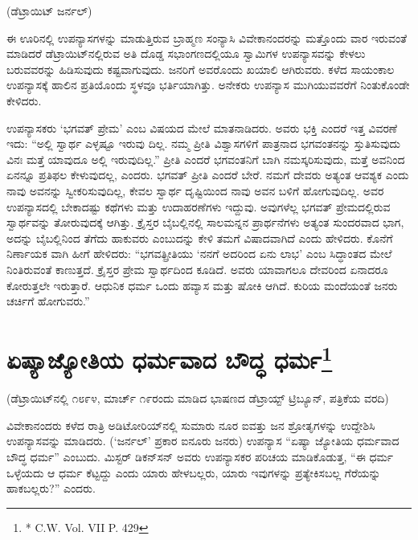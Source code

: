 \delimiter

\begin{center}
(ಡೆಟ್ರಾಯಿಟ್​ ಜರ್ನಲ್​)
\end{center}

ಈ ಊರಿನಲ್ಲಿ ಉಪನ್ಯಾಸಗಳನ್ನು ಮಾಡುತ್ತಿರುವ ಬ್ರಾಹ್ಮಣ ಸಂನ್ಯಾಸಿ ವಿವೇಕಾನಂದರನ್ನು ಮತ್ತೊಂದು ವಾರ ಇರುವಂತೆ ಮಾಡಿದರೆ ಡೆಟ್ರಾಯಿಟ್​ನಲ್ಲಿರುವ ಅತಿ ದೊಡ್ಡ ಸಭಾಂಗಣದಲ್ಲಿಯೂ ಸ್ವಾಮಿಗಳ ಉಪನ್ಯಾಸವನ್ನು ಕೇಳಲು ಬರುವವರನ್ನು ಹಿಡಿಸುವುದು ಕಷ್ಟವಾಗುವುದು. ಜನರಿಗೆ ಅವರೊಂದು ಖಯಾಲಿ ಆಗಿರುವರು. ಕಳೆದ ಸಾಯಂಕಾಲ ಉಪನ್ಯಾಸಕ್ಕೆ ಹಾಲಿನ ಪ್ರತಿಯೊಂದು ಸ್ಥಳವೂ ಭರ್ತಿಯಾಗಿತ್ತು. ಅನೇಕರು ಉಪನ್ಯಾಸ ಮುಗಿಯುವವರೆಗೆ ನಿಂತುಕೊಂಡೇ ಕೇಳಿದರು.

ಉಪನ್ಯಾಸಕರು ‘ಭಗವತ್​ ಪ್ರೇಮ’ ಎಂಬ ವಿಷಯದ ಮೇಲೆ ಮಾತನಾಡಿದರು. ಅವರು ಭಕ್ತಿ ಎಂದರೆ ಇತ್ತ ವಿವರಣೆ ಇದು: “ಅಲ್ಲಿ ಸ್ವಾರ್ಥ ಎಳ್ಳಷ್ಟೂ ಇರುವು ದಿಲ್ಲ. ನಮ್ಮ ಪ್ರೀತಿ ವಿಶ್ವಾಸಗಳಿಗೆ ಪಾತ್ರನಾದ ಭಗವಂತನನ್ನು ಸ್ತುತಿಸುವುದು ವಿನಃ ಮತ್ತೆ ಯಾವುದೂ ಅಲ್ಲಿ ಇರುವುದಿಲ್ಲ.” ಪ್ರೀತಿ ಎಂದರೆ ಭಗವಂತನಿಗೆ ಬಾಗಿ ನಮಸ್ಕರಿಸುವುದು, ಮತ್ತೆ ಅವನಿಂದ ಏನನ್ನೂ ಪ್ರತಿಫಲ ಕೇಳುವುದಲ್ಲ, ಎಂದರು. ಭಗವತ್​ ಪ್ರೀತಿ ಎಂದರೆ ಬೇರೆ. ನಮಗೆ ದೇವರು ಅತ್ಯಂತ ಆವಶ್ಯಕ ಎಂದು ನಾವು ಅವನನ್ನು ಸ್ವೀಕರಿಸುವುದಿಲ್ಲ, ಕೇವಲ ಸ್ವಾರ್ಥ ದೃಷ್ಟಿಯಿಂದ ನಾವು ಅವನ ಬಳಿಗೆ ಹೋಗುವುದಿಲ್ಲ. ಅವರ ಉಪನ್ಯಾಸದಲ್ಲಿ ಬೇಕಾದಷ್ಟು ಕಥೆಗಳು ಮತ್ತು ಉದಾಹರಣೆಗಳು ಇದ್ದುವು. ಅವುಗಳೆಲ್ಲ ಭಗವತ್​ ಪ್ರೇಮದಲ್ಲಿರುವ ಸ್ವಾರ್ಥವನ್ನು ತೋರುವುದಕ್ಕೆ ಆಗಿತ್ತು. ಕ್ರೈಸ್ತರ ಬೈಬಲ್ಲಿನಲ್ಲಿ ಸಾಲಮನ್ನನ ಪ್ರಾರ್ಥನೆಗಳು ಅತ್ಯಂತ ಸುಂದರವಾದ ಭಾಗ, ಅದನ್ನು ಬೈಬಲ್ಲಿನಿಂದ ತೆಗೆದು ಹಾಕುವರು ಎಂಬುದನ್ನು ಕೇಳಿ ತಮಗೆ ವಿಷಾದವಾಗಿದೆ ಎಂದು ಹೇಳಿದರು. ಕೊನೆಗೆ ನಿರ್ಣಾಯಕ ವಾಗಿ ಹೀಗೆ ಹೇಳಿದರು: “ಭಗವತ್ಪ್ರೀತಿಯು ‘ನನಗೆ ಅದರಿಂದ ಏನು ಲಾಭ’ ಎಂಬ ಸಿದ್ಧಾಂತದ ಮೇಲೆ ನಿಂತಿರುವಂತೆ ಕಾಣುತ್ತದೆ. ಕ್ರೈಸ್ತರ ಪ್ರೇಮ ಸ್ವಾರ್ಥದಿಂದ ಕೂಡಿದೆ. ಅವರು ಯಾವಾಗಲೂ ದೇವರಿಂದ ಏನಾದರೂ ಕೋರುತ್ತಲೇ ಇರುತ್ತಾರೆ. ಆಧುನಿಕ ಧರ್ಮ ಒಂದು ಹವ್ಯಾಸ ಮತ್ತು ಷೋಕಿ ಆಗಿದೆ. ಕುರಿಯ ಮಂದೆಯಂತೆ ಜನರು ಚರ್ಚಿಗೆ ಹೋಗುವರು.”


\section[ಏಷ್ಯಾಜ್ಯೋತಿಯ ಧರ್ಮವಾದ ಬೌದ್ಧ ಧರ್ಮ]{ಏಷ್ಯಾಜ್ಯೋತಿಯ ಧರ್ಮವಾದ ಬೌದ್ಧ ಧರ್ಮ\protect\footnote{* C.W. Vol. VII P. 429}}

\begin{center}
(ಡೆಟ್ರಾಯಿಟ್​ನಲ್ಲಿ ೧೮೯೪, ಮಾರ್ಚ್​ ೧೯ರಂದು ಮಾಡಿದ ಭಾಷಣದ ಡೆಟ್ರಾಯ್ಟ್​ ಟ್ರಿಬ್ಯೂನ್​, ಪತ್ರಿಕೆಯ ವರದಿ)
\end{center}

ವಿವೇಕಾನಂದರು ಕಳೆದ ರಾತ್ರಿ ಅಡಿಟೋರಿಯ್​ನಲ್ಲಿ ಸುಮಾರು ನೂರ ಐವತ್ತು ಜನ ಶ್ರೋತೃಗಳನ್ನು ಉದ್ದೇಶಿಸಿ ಉಪನ್ಯಾಸವನ್ನು ಮಾಡಿದರು. (‘ಜರ್ನಲ್​’ ಪ್ರಕಾರ ಐನೂರು ಜನರು) ಉಪನ್ಯಾಸ “ಏಷ್ಯಾ ಜ್ಯೋತಿಯ ಧರ್ಮವಾದ ಬೌದ್ಧ ಧರ್ಮ” ಎಂಬುದು. ಮಿಸ್ಟರ್​ ಡಿಕನ್​ಸನ್​ ಅವರು ಉಪನ್ಯಾಸಕರ ಪರಿಚಯ ಮಾಡಿಕೊಡುತ್ತ, “ಈ ಧರ್ಮ ಒಳ್ಳೆಯದು ಆ ಧರ್ಮ ಕೆಟ್ಟದ್ದು ಎಂದು ಯಾರು ಹೇಳಬಲ್ಲರು, ಯಾರು ಇವುಗಳನ್ನು ಪ್ರತ್ಯೇಕಿಸಬಲ್ಲ ಗೆರೆಯನ್ನು ಹಾಕಬಲ್ಲರು?” ಎಂದರು.


